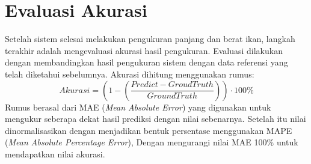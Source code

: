 
\section{Evaluasi Akurasi}
    Setelah sistem selesai melakukan pengukuran panjang dan berat ikan, langkah terakhir adalah mengevaluasi akurasi hasil pengukuran. Evaluasi dilakukan dengan membandingkan hasil pengukuran sistem dengan data referensi yang telah diketahui sebelumnya. 
    Akurasi dihitung menggunakan rumus:
\begin{equation}
    Akurasi = (1 - (\frac{Predict - GroudTruth}{GroundTruth})) \cdot 100\%
\end{equation}
    Rumus berasal dari MAE (\emph{Mean Absolute Error}) yang digunakan untuk mengukur seberapa dekat hasil prediksi dengan nilai sebenarnya.
Setelah itu nilai dinormalisasikan dengan menjadikan bentuk persentase menggunakan MAPE (\emph{Mean Absolute Percentage Error}), Dengan mengurangi nilai MAE 100\% untuk mendapatkan nilai akurasi. 
 
